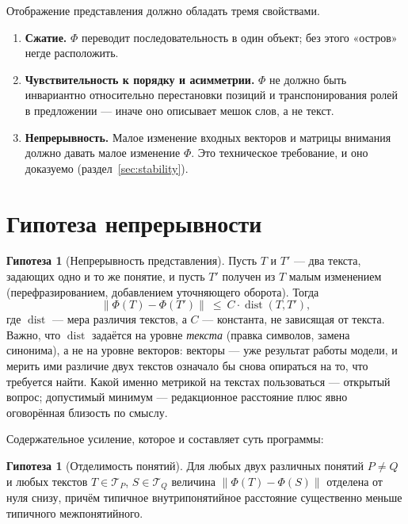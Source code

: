 \documentclass[11pt,a4paper]{article}
\theoremstyle{definition}
\newtheorem{hypothesis}[definition]{Гипотеза}
\theoremstyle{plain}
\newcommand{\norm}[1]{\left\lVert #1 \right\rVert}
\begin{document}
Отображение представления должно обладать тремя свойствами.

\begin{enumerate}[label=(\roman*)]
\item \textbf{Сжатие.} $\Phi$ переводит последовательность в один объект; без этого «остров»
негде расположить.
\item \textbf{Чувствительность к порядку и асимметрии.} $\Phi$ не должно быть инвариантно
относительно перестановки позиций и транспонирования ролей в предложении — иначе оно
описывает мешок слов, а не текст.
\item \textbf{Непрерывность.} Малое изменение входных векторов и матрицы внимания должно давать
малое изменение $\Phi$. Это техническое требование, и оно доказуемо (раздел~\ref{sec:stability}).
\end{enumerate}

\section{Гипотеза непрерывности}

\begin{hypothesis}[Непрерывность представления]\label{hyp:continuity}
Пусть $T$ и $T'$ — два текста, задающих одно и то же понятие, и пусть $T'$ получен из $T$
малым изменением (перефразированием, добавлением уточняющего оборота). Тогда
\[
\norm{\Phi(T)-\Phi(T')}\ \le\ C\cdot \operatorname{dist}(T,T'),
\]
где $\operatorname{dist}$ — мера различия текстов, а $C$ — константа, не зависящая от текста.
Важно, что $\operatorname{dist}$ задаётся на уровне \emph{текста} (правка символов, замена
синонима), а не на уровне векторов: векторы — уже результат работы модели, и мерить ими
различие двух текстов означало бы снова опираться на то, что требуется найти. Какой именно
метрикой на текстах пользоваться — открытый вопрос; допустимый минимум — редакционное
расстояние плюс явно оговорённая близость по смыслу.
\end{hypothesis}

Содержательное усиление, которое и составляет суть программы:
\begin{hypothesis}[Отделимость понятий]\label{hyp:separation}
Для любых двух различных понятий $P\ne Q$ и любых текстов $T\in\mathcal{T}_P$, $S\in\mathcal{T}_Q$
величина $\norm{\Phi(T)-\Phi(S)}$ отделена от нуля снизу, причём типичное внутрипонятийное
расстояние существенно меньше типичного межпонятийного.
\end{hypothesis}
\end{document}
